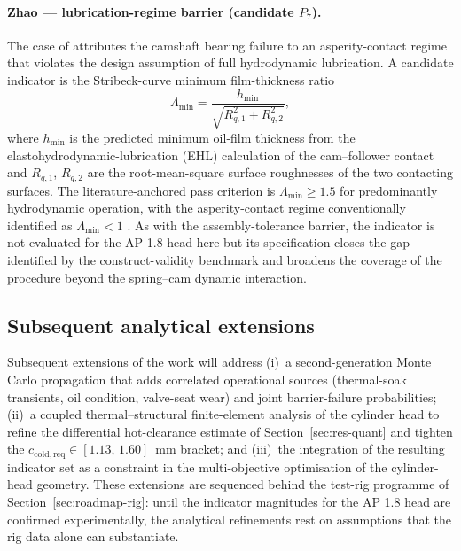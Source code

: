 \paragraph{Zhao --- lubrication-regime barrier (candidate $P_{7}$).}
The case of \citet{zhao2023camshaftV6} attributes the camshaft
bearing failure to an asperity-contact regime that violates the
design assumption of full hydrodynamic lubrication. A candidate
indicator is the Stribeck-curve minimum film-thickness ratio
\begin{equation}
\Lambda_{\min}=\frac{h_{\min}}{\sqrt{R_{q,1}^{2}+R_{q,2}^{2}}},
\label{eq:stribeck}
\end{equation}
where $h_{\min}$ is the predicted minimum oil-film thickness from
the elastohydrodynamic-lubrication (EHL) calculation of the
cam--follower contact and $R_{q,1}$, $R_{q,2}$ are the root-mean-square
surface roughnesses of the two contacting surfaces. The
literature-anchored pass criterion is $\Lambda_{\min}\geq 1.5$ for
predominantly hydrodynamic operation, with the asperity-contact
regime conventionally identified as $\Lambda_{\min}<1$
\citep[\S~12-13]{shigley2020}. As with the assembly-tolerance
barrier, the indicator is not evaluated for the AP 1.8 head here
but its specification closes the gap identified by the
construct-validity benchmark and broadens the coverage of the
procedure beyond the spring--cam dynamic interaction.

\subsection{Subsequent analytical extensions}\label{sec:roadmap-extensions}

Subsequent extensions of the work will address (i)~a
second-generation Monte Carlo propagation that adds correlated
operational sources (thermal-soak transients, oil condition,
valve-seat wear) and joint barrier-failure probabilities; (ii)~a
coupled thermal--structural finite-element analysis of the cylinder
head to refine the differential hot-clearance estimate of
Section~\ref{sec:res-quant} and tighten the
$c_{\mathrm{cold,req}}\in [1.13,\,1.60]$~mm bracket; and (iii)~the
integration of the resulting indicator set as a constraint in the
multi-objective optimisation of the cylinder-head geometry. These
extensions are sequenced behind the test-rig programme of
Section~\ref{sec:roadmap-rig}: until the indicator magnitudes for
the AP 1.8 head are confirmed experimentally, the analytical
refinements rest on assumptions that the rig data alone can
substantiate.
